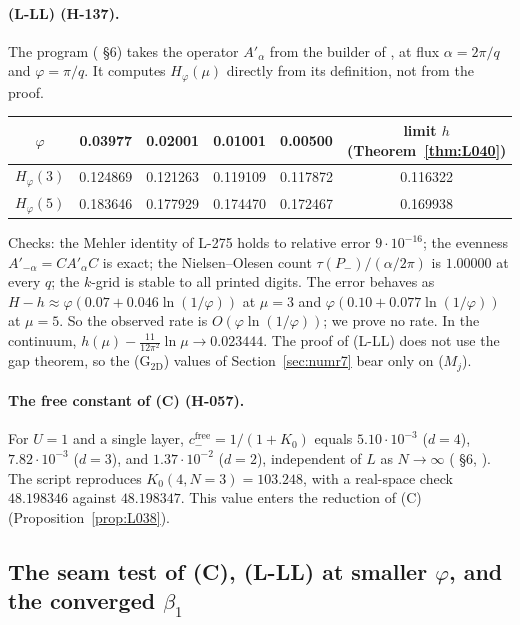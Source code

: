 \paragraph{(L-LL) (H-137).} The program  ( \S6) takes the operator $A'_\alpha$ from the builder of , at flux $\alpha=2\pi/q$ and $\varphi=\pi/q$. It computes $H_\varphi(\mu)$ directly from its definition, not from the proof.
\begin{longtable}{|c|c|c|c|c|c|}
\hline
$\varphi$ & 0.03977 & 0.02001 & 0.01001 & 0.00500 & limit $h$ (Theorem~\ref{thm:L040}) \\ \hline
$H_\varphi(3)$ & 0.124869 & 0.121263 & 0.119109 & 0.117872 & 0.116322 \\ \hline
$H_\varphi(5)$ & 0.183646 & 0.177929 & 0.174470 & 0.172467 & 0.169938 \\ \hline
\end{longtable}
Checks: the Mehler identity of L-275 holds to relative error $9\cdot10^{-16}$; the evenness $A'_{-\alpha}=CA'_\alpha C$ is exact; the Nielsen--Olesen count $\tau(P_-)/(\alpha/2\pi)$ is $1.00000$ at every $q$; the $k$-grid is stable to all printed digits. The error behaves as $H-h\approx\varphi(0.07+0.046\ln(1/\varphi))$ at $\mu=3$ and $\varphi(0.10+0.077\ln(1/\varphi))$ at $\mu=5$. So the observed rate is $O(\varphi\ln(1/\varphi))$; we prove no rate. In the continuum, $h(\mu)-\frac{11}{12\pi^2}\ln\mu\to0.023444$. The proof of (L-LL) does not use the gap theorem, so the (G$_{\mathrm{2D}}$) values of Section~\ref{sec:numr7} bear only on ($M_j$).

\paragraph{The free constant of (C) (H-057).} For $U=1$ and a single layer, $c_-^{\mathrm{free}}=1/(1+K_0)$ equals $5.10\cdot10^{-3}$ ($d=4$), $7.82\cdot10^{-3}$ ($d=3$), and $1.37\cdot10^{-2}$ ($d=2$), independent of $L$ as $N\to\infty$ ( \S6, ). The script reproduces $K_0(4,N=3)=103.248$, with a real-space check $48.198346$ against $48.198347$. This value enters the reduction of (C) (Proposition~\ref{prop:L038}).

\subsection{The seam test of (C), (L-LL) at smaller $\varphi$, and the converged $\beta_1$}\label{sec:numr9}

